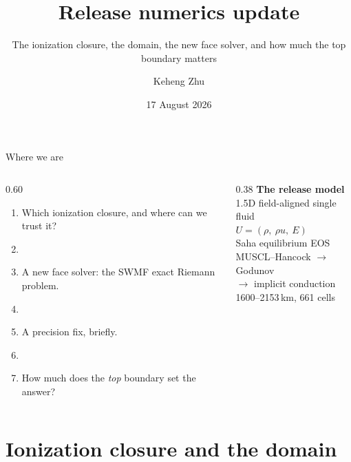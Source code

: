 \documentclass[aspectratio=169]{beamer}
\title[Release numerics update]{Release numerics update}
\subtitle{The ionization closure, the domain, the new face solver, and how much
          the top boundary matters}
\author{Keheng Zhu}
\institute{University of Michigan}
\date{17 August 2026}
\begin{document}
\begin{frame}
  \titlepage
\end{frame}

\begin{frame}{Where we are}
  \vfill
  \begin{columns}[T]
    \begin{column}{0.60\textwidth}
      \begin{enumerate}
        \item Which ionization closure, and where can we trust it?
        \item[]
        \item A new face solver: the SWMF exact Riemann problem.
        \item[]
        \item {\color{gray}A precision fix, briefly.}
        \item[]
        \item How much does the \emph{top} boundary set the answer?
      \end{enumerate}
    \end{column}
    \begin{column}{0.38\textwidth}
      \footnotesize
      \textbf{The release model}\\[4pt]
      1.5D field-aligned single fluid\\[2pt]
      $U=(\rho,\ \rho u,\ E)$\\[6pt]
      Saha equilibrium EOS\\[2pt]
      MUSCL--Hancock $\rightarrow$ Godunov\\[2pt]
      $\rightarrow$ implicit conduction\\[6pt]
      1600--2153\,km, 661 cells
    \end{column}
  \end{columns}
  \vfill
\end{frame}

\section{Ionization closure and the domain}
\end{document}
